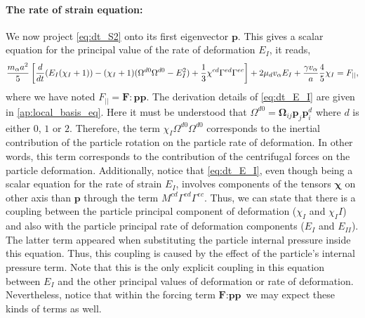 \paragraph*{The rate of strain equation:}
We now project \ref{eq:dt_S2} onto its first eigenvector $\textbf{p}$.
This gives a scalar equation for the principal value of the rate of deformation $E_I$, it reads, 
\begin{equation}
    \frac{m_\alpha a^2}{5} \left[
        \ddt (E_I (\chi_I+1))
        - (\chi_I+1)( \Omega^{d0} \Omega^{d0}  - E_I^2) 
        + \frac{1}{3} \chi^{cd}
        \Gamma^{ed}\Gamma^{ec}
    \right]
    + 2 \mu_d v_\alpha E_I
    + \frac{\gamma v_\alpha }{a} 
    \frac{4  }{5} \chi_I
    = F_{||},
    \label{eq:dt_E_I}
\end{equation} 
where we have noted $F_{||} = \textbf{F}: \textbf{pp}$.
The derivation details of \ref{eq:dt_E_I} are given in \ref{ap:local_basis_eq}. 
Here it must be understood that $\Omega^{d0}  = \bm\Omega_{ij} \textbf{p}_j \textbf{p}^{d}_i $ where $d$ is either $0$, $1$ or $2$. 
Therefore, the term $\chi_I \Omega^{d0} \Omega^{d0}$ corresponds to the inertial contribution of the particle rotation on the particle rate of deformation. 
In other words, this term corresponds to the contribution of the centrifugal forces on the particle deformation. 
Additionally, notice that \ref{eq:dt_E_I}, even though being a scalar equation for the rate of strain $E_I$, involves components of the tensors $\bm\chi$ on other axis than $\textbf{p}$ through the term $M^{cd}\Gamma^{ed}\Gamma^{ec}$. 
Thus, we can state that there is a coupling between the particle principal component of deformation ($\chi_I$ and $\chi_II$) and also with the particle principal rate of deformation components ($E_I$ and $E_{II}$).
The latter term appeared when substituting the particle internal pressure inside this equation. 
Thus, this coupling is caused by the effect of the particle's internal pressure term. 
Note that this is the only explicit coupling in this equation between $E_I$ and the other principal values of deformation or rate of deformation. 
Nevertheless, notice that within the forcing term $\textbf{F}:\textbf{pp}$ we may expect these kinds of terms as well. 


